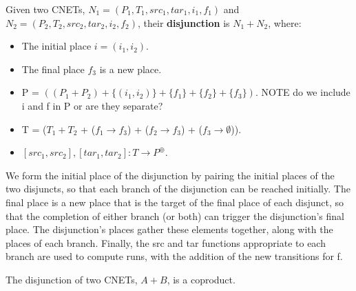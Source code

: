 \begin{definition}
  \label{def:OR-PN}
  Given two CNETs, $N_1= (P_1, T_1, src_1, tar_1, i_1, f_1)$ and $N_2= (P_2, T_2, src_2, tar_2, i_2, f_2)$, their \textbf{disjunction} is $N_1 + N_2$, where: 
\begin{itemize}
\item The initial place $i = (i_1 , i_2)$.
\item The final place $f_3$ is a new place.
\item P = $((P_1 + P_2) + \{(i_1 , i_2)\} + \{f_1\} + \{f_2\} + \{f_3\}).$ NOTE do we include i and f in P or are they separate?
\item T = ($T_1 + T_2$ + ($f_1 \to f_3$) + ($f_2 \to f_3$) + ($f_3 \to \emptyset$)).
\item $[src_1, src_2], [tar_1, tar_2]: T\to P^\oplus$. 
\end{itemize}
We form the initial place of the disjunction by pairing the initial places of the two disjuncts, so that each branch of the disjunction can be reached initially. The final place is a new place that is the target of the final place of each disjunct, so that the completion of either branch (or both) can trigger the disjunction's final place. The disjunction's places gather these elements together, along with the places of each branch. Finally, the src and tar functions appropriate to each branch are used to compute runs, with the addition of the new transitions for f.  
\end{definition}
\begin{lemma}
  \label{lemma:OR-coproduct}
  The disjunction of two CNETs, $A + B$, is a coproduct. 
\end{lemma}
